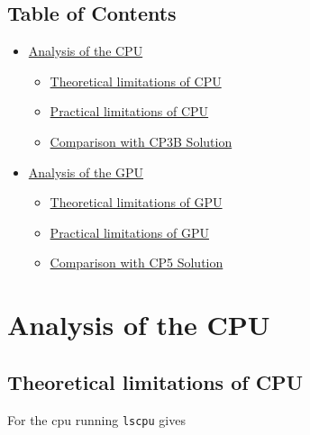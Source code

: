 \hypertarget{table-of-contents}{%
\subsection{Table of Contents}\label{table-of-contents}}

\begin{itemize}
\tightlist
\item
  \protect\hyperlink{analysis-of-the-cpu}{Analysis of the CPU}

  \begin{itemize}
  \tightlist
  \item
    \protect\hyperlink{theoretical-limitations-of-cpu}{Theoretical
    limitations of CPU}
  \item
    \protect\hyperlink{practical-limitations-of-cpu}{Practical
    limitations of CPU}
  \item
    \protect\hyperlink{comparison-with-cp3b-solution}{Comparison with
    CP3B Solution}
  \end{itemize}
\item
  \protect\hyperlink{analysis-of-the-gpu}{Analysis of the GPU}

  \begin{itemize}
  \tightlist
  \item
    \protect\hyperlink{theoretical-limitations-of-gpu}{Theoretical
    limitations of GPU}
  \item
    \protect\hyperlink{practical-limitations-of-gpu}{Practical
    limitations of GPU}
  \item
    \protect\hyperlink{comparison-with-cp5-solution}{Comparison with CP5
    Solution}
  \end{itemize}
\end{itemize}

\hypertarget{analysis-of-the-cpu}{%
\section{Analysis of the CPU}\label{analysis-of-the-cpu}}

\hypertarget{theoretical-limitations-of-cpu}{%
\subsection{Theoretical limitations of
CPU}\label{theoretical-limitations-of-cpu}}

For the cpu running \texttt{lscpu} gives

